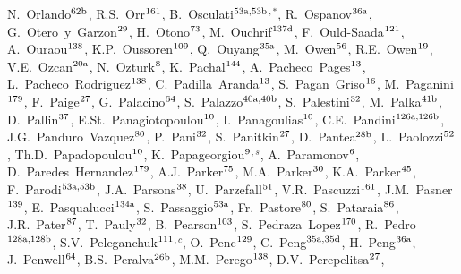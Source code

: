 \begin{flushleft}
N.~Orlando$^\textrm{\scriptsize 62b}$,
R.S.~Orr$^\textrm{\scriptsize 161}$,
B.~Osculati$^\textrm{\scriptsize 53a,53b}$$^{,*}$,
R.~Ospanov$^\textrm{\scriptsize 36a}$,
G.~Otero~y~Garzon$^\textrm{\scriptsize 29}$,
H.~Otono$^\textrm{\scriptsize 73}$,
M.~Ouchrif$^\textrm{\scriptsize 137d}$,
F.~Ould-Saada$^\textrm{\scriptsize 121}$,
A.~Ouraou$^\textrm{\scriptsize 138}$,
K.P.~Oussoren$^\textrm{\scriptsize 109}$,
Q.~Ouyang$^\textrm{\scriptsize 35a}$,
M.~Owen$^\textrm{\scriptsize 56}$,
R.E.~Owen$^\textrm{\scriptsize 19}$,
V.E.~Ozcan$^\textrm{\scriptsize 20a}$,
N.~Ozturk$^\textrm{\scriptsize 8}$,
K.~Pachal$^\textrm{\scriptsize 144}$,
A.~Pacheco~Pages$^\textrm{\scriptsize 13}$,
L.~Pacheco~Rodriguez$^\textrm{\scriptsize 138}$,
C.~Padilla~Aranda$^\textrm{\scriptsize 13}$,
S.~Pagan~Griso$^\textrm{\scriptsize 16}$,
M.~Paganini$^\textrm{\scriptsize 179}$,
F.~Paige$^\textrm{\scriptsize 27}$,
G.~Palacino$^\textrm{\scriptsize 64}$,
S.~Palazzo$^\textrm{\scriptsize 40a,40b}$,
S.~Palestini$^\textrm{\scriptsize 32}$,
M.~Palka$^\textrm{\scriptsize 41b}$,
D.~Pallin$^\textrm{\scriptsize 37}$,
E.St.~Panagiotopoulou$^\textrm{\scriptsize 10}$,
I.~Panagoulias$^\textrm{\scriptsize 10}$,
C.E.~Pandini$^\textrm{\scriptsize 126a,126b}$,
J.G.~Panduro~Vazquez$^\textrm{\scriptsize 80}$,
P.~Pani$^\textrm{\scriptsize 32}$,
S.~Panitkin$^\textrm{\scriptsize 27}$,
D.~Pantea$^\textrm{\scriptsize 28b}$,
L.~Paolozzi$^\textrm{\scriptsize 52}$,
Th.D.~Papadopoulou$^\textrm{\scriptsize 10}$,
K.~Papageorgiou$^\textrm{\scriptsize 9}$$^{,s}$,
A.~Paramonov$^\textrm{\scriptsize 6}$,
D.~Paredes~Hernandez$^\textrm{\scriptsize 179}$,
A.J.~Parker$^\textrm{\scriptsize 75}$,
M.A.~Parker$^\textrm{\scriptsize 30}$,
K.A.~Parker$^\textrm{\scriptsize 45}$,
F.~Parodi$^\textrm{\scriptsize 53a,53b}$,
J.A.~Parsons$^\textrm{\scriptsize 38}$,
U.~Parzefall$^\textrm{\scriptsize 51}$,
V.R.~Pascuzzi$^\textrm{\scriptsize 161}$,
J.M.~Pasner$^\textrm{\scriptsize 139}$,
E.~Pasqualucci$^\textrm{\scriptsize 134a}$,
S.~Passaggio$^\textrm{\scriptsize 53a}$,
Fr.~Pastore$^\textrm{\scriptsize 80}$,
S.~Pataraia$^\textrm{\scriptsize 86}$,
J.R.~Pater$^\textrm{\scriptsize 87}$,
T.~Pauly$^\textrm{\scriptsize 32}$,
B.~Pearson$^\textrm{\scriptsize 103}$,
S.~Pedraza~Lopez$^\textrm{\scriptsize 170}$,
R.~Pedro$^\textrm{\scriptsize 128a,128b}$,
S.V.~Peleganchuk$^\textrm{\scriptsize 111}$$^{,c}$,
O.~Penc$^\textrm{\scriptsize 129}$,
C.~Peng$^\textrm{\scriptsize 35a,35d}$,
H.~Peng$^\textrm{\scriptsize 36a}$,
J.~Penwell$^\textrm{\scriptsize 64}$,
B.S.~Peralva$^\textrm{\scriptsize 26b}$,
M.M.~Perego$^\textrm{\scriptsize 138}$,
D.V.~Perepelitsa$^\textrm{\scriptsize 27}$,
$$
\end{flushleft}
